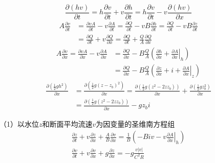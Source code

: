   \begin{equation}
    \frac{\partial (hv)}{\partial t}
    =
    h\frac{\partial v}{\partial t}
    +
    v\frac{\partial h}{\partial t}
    =
    h\frac{\partial v}{\partial t}
    -
    v\frac{\partial (hv)}{\partial x}
  \end{equation}
  \begin{equation}
    \begin{aligned}
    A\frac{\partial v}{\partial t}
    &=
    \frac{\partial vA}{\partial t}
    -
    v\frac{\partial A}{\partial t}
    =
    \frac{\partial Q}{\partial t}
    -
    vB\frac{\partial h}{\partial t}
    =
    \frac{\partial Q}{\partial t}
    -
    vB\frac{\partial z}{\partial t}
    \\
    &=
    \frac{\partial Q}{\partial t}
    +
    v\frac{\partial Q}{\partial x}
    =
    \frac{\partial Q}{\partial t}
    +
    \frac{Q}{A}\frac{\partial Q}{\partial x}
  \end{aligned}
  \end{equation}
\begin{equation}
    \begin{aligned}
    A\frac{\partial v}{\partial x}
    =
    \frac{\partial vA}{\partial x}
    -
    v\frac{\partial A}{\partial x}
    &=
    \frac{\partial Q}{\partial x}
    -
    B\frac{Q}{A}\left(
    \frac{\partial h}{\partial x}
    +
    \left.\frac{\partial A}{\partial x}\right|_{h}
      \right)
    \\
    &=
    \frac{\partial Q}{\partial x}
    -
    B\frac{Q}{A}\left(
    \frac{\partial z}{\partial x}
    +
    i
    +
    \left.\frac{\partial A}{\partial x}\right|_{z}
      \right)
  \end{aligned}
  \end{equation}
  \begin{equation}
    \begin{aligned}
    \frac{\partial (\frac{1}{2}gh^{2})}{\partial x}
    &=
    \frac{\partial (\frac{1}{2}g(z-z_{b})^{2})}{\partial x}
    =
    \frac{\partial (\frac{1}{2}g(z^{2}-2zz_{b}))}{\partial x}
    +
    \frac{\partial (\frac{1}{2}gz_{b}^{2})}{\partial x}
    \\
    &=
    \frac{\partial (\frac{1}{2}g(z^{2}-2zz_{b}))}{\partial x}
    -
    gz_{b}i
  \end{aligned}
\end{equation}




（1）以水位$z$和断面平均流速$v$为因变量的圣维南方程组
\begin{equation}
  \begin{gathered}
    \frac{\partial z}{\partial t}
    +
    v\frac{\partial z}{\partial x}
    +
    \frac{A}{B}\frac{\partial v}{\partial x}
    =
    \frac{1}{B}
    \left(
    - Biv - v\left.\frac{\partial A}{\partial x}\right|_{h}
    \right)
    \\
    \frac{\partial v}{\partial t}
    +
    v\frac{\partial v}{\partial x}
    +
    g\frac{\partial z}{\partial x}
    =
    -g\frac{v|v|}{C^{2}R}
  \end{gathered}
  \label{EqCGe_SV_zU}
\end{equation}

